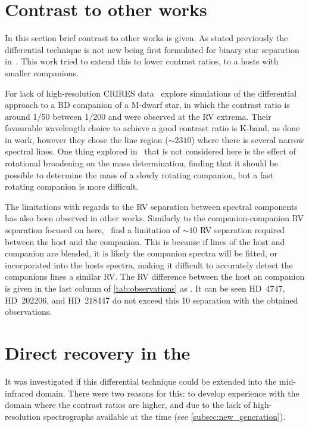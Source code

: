 \section{Contrast to other works}

In this section brief contrast to other works is given.
As stated previously the differential technique is not new being first formulated for binary star separation in~\citet{ferluga_separating_1997}.
This work tried to extend this to lower contrast ratios, to a hosts with smaller companions.

For lack of high-resolution CRIRES data~\citet{kostogryz_spectral_2013} explore simulations of the differential approach to a {BD} companion of a M-dwarf star, in which the contrast ratio is around 1/50 between 1/200 and were observed at the {RV} extrema.
Their favourable wavelength choice to achieve a good contrast ratio is K-band, as done in work, however they chose the  line region ($\sim2310$\nm{}) where there is several narrow spectral lines.
One thing explored in~\citet{kostogryz_spectral_2013} that is not considered here is the effect of rotational broadening on the mass determination, finding that it should be possible to determine the mass of a slowly rotating companion, but a fast rotating companion is more difficult.

The limitations with regards to the {RV} separation between spectral components has also been observed in other works.
Similarly to the companion-companion {RV} separation focused on here,~\citet{kolbl_detection_2015} find a limitation of $\sim 10$\kmps{} {RV} separation required between the host and the companion.
This is because if lines of the host and companion are blended, it is likely the companion spectra will be fitted, or incorporated into the hosts spectra, making it difficult to accurately detect the companions lines a similar {RV}.
The {RV} difference between the host an companion is given in the last column of \cref{tab:observations} as \Rvtwo{}.
It can be seen {HD~4747}, {HD~202206}, and {HD~218447} do not exceed this 10\kmps{} separation with the obtained observations.


\section{Direct recovery in the \mir{}}
It was investigated if this differential technique could be extended into the mid-infrared {\mir{}} domain.
There were two reasons for this: to develop experience with the {\mir{}} domain where the contrast ratios are higher, and due to the lack of high-resolution \nir{} spectrographs available at the time (see \cref{subsec:new_generation}).

